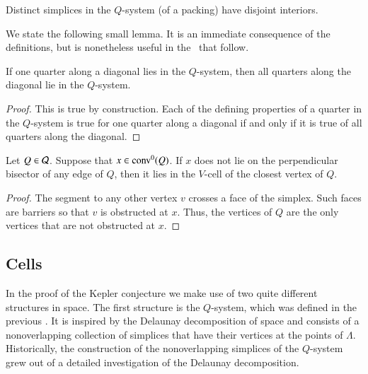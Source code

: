 \begin{claim}\label{thm:nonoverlap}
Distinct simplices in the $Q$-system (of a %
packing) have
disjoint interiors.
\end{claim}


We state the following small lemma. It is an immediate consequence
of the definitions, but is nonetheless useful in the \chaps\ that
follow.

\begin{lemma} \label{lemma:diags-engulf}
If one quarter along a diagonal lies in the $Q$-system, then all
quarters along the diagonal lie in the $Q$-system.
\end{lemma}

\begin{proof} This is true by construction.  Each of the defining properties
of a quarter in the $Q$-system is true for one quarter along a
diagonal if and only if  it is true of all quarters along the
diagonal.
\end{proof}



\begin{lemma}\label{lemma:Q-divide}
Let $Q\in{\mathcal Q}$. Suppose that $x\in {\operatorname{conv}}^0(Q)$.
If $x$
does not lie on the perpendicular bisector of any edge of $Q$,
then it lies in the $V$-cell of the closest vertex of $Q$.
\end{lemma}

\begin{proof} The segment to any other vertex $v$ crosses a face of the
simplex. Such faces are barriers so that $v$ is obstructed at $x$.
Thus, the vertices of $Q$ are the only vertices that are not
obstructed at $x$.
\end{proof}



\subsection{Cells}
\label{sec:cells} \label{sec:vcells}

In the proof of the Kepler conjecture we make use of two quite
different structures in space.  The first structure is the
$Q$-system, which was defined in the previous \chap.  It is
inspired by the Delaunay decomposition of space and consists of a
nonoverlapping collection of simplices that have their vertices at
the points of $\Lambda$.  Historically, the construction of the
nonoverlapping simplices of the $Q$-system grew out of a detailed
investigation of the Delaunay decomposition.


